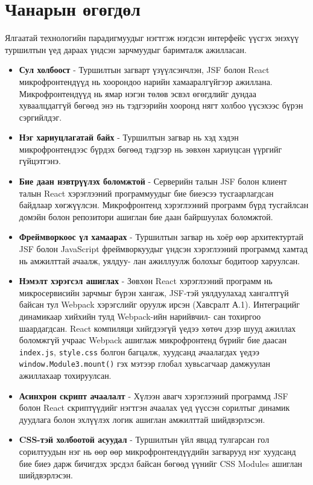 \section{Чанарын өгөгдөл}
Ялгаатай технологийн парадигмуудыг нэгтгэж нэгдсэн интерфейс үүсгэх энэхүү туршилтын үед дараах үндсэн зарчмуудыг баримталж ажилласан. 

\begin{itemize}
    \item \textbf{Сул холбоост} - Туршилтын загварт үзүүлсэнчлэн, JSF болон React микрофронтендүүд нь хоорондоо нарийн хамааралгүйгээр ажиллана. Микрофронтендүүд нь ямар нэгэн төлөв эсвэл өгөгдлийг дундаа хуваалцдаггүй бөгөөд энэ нь тэдгээрийн хооронд нягт холбоо үүсэхээс бүрэн сэргийлдэг.
    \item \textbf{Нэг хариуцлагатай байх} - Туршилтын загвар нь хэд хэдэн микрофронтендээс бүрдэх бөгөөд тэдгээр нь зөвхөн хариуцсан үүргийг гүйцэтгэнэ.
    \item \textbf{Бие даан нэвтрүүлэх боломжтой} - Серверийн талын JSF болон клиент талын React хэрэглээний программуудыг бие биеэсээ тусгаарлагдсан байдлаар хөгжүүлсэн. Микрофронтенд хэрэглээний программ бүрд тусгайлсан домэйн болон репозитори ашиглан бие даан байршуулах боломжтой. 
    \item \textbf{Фреймворкоос үл хамаарах} - Туршилтын загвар нь хоёр өөр архитектуртай JSF болон JavaScript фреймворкуудыг үндсэн хэрэглээний программд хамтад нь амжилттай ачаалж, уялдуу- лан ажиллуулж болохыг бодитоор харуулсан.
    \item \textbf{Нэмэлт хэрэгсэл ашиглах} - Зөвхөн React хэрэглээний программ нь микросервисийн зарчмыг бүрэн хангаж, JSF-тэй уялдуулахад хангалтгүй байсан тул Webpack хэрэгслийг оруулж ирсэн (Хавсралт А.1). Интеграцийг динамикаар хийхийн тулд Webpack-ийн нарийвчил- сан тохиргоо шаардагдсан.  React компиляци хийгдээгүй үедээ хөтөч дээр шууд ажиллах боломжгүй учраас Webpack ашиглаж микрофронтенд бүрийг бие даасан \texttt{index.js}, \texttt{style.css} болгон багцалж, хуудсанд ачаалагдах үедээ \texttt{window.Module3.mount()} гэх мэтээр глобал хувьсагчаар дамжуулан ажиллахаар тохируулсан.
    \item \textbf{Асинхрон скрипт ачаалалт} - Хүлээн авагч хэрэглээний программд JSF болон React скриптүүдийг нэгтгэн ачаалах үед үүссэн сорилтыг динамик дуудлага болон эхлүүлэх логик ашиглан амжилттай шийдвэрлэсэн.
    \item \textbf{CSS-тэй холбоотой асуудал} - Туршилтын үйл явцад тулгарсан гол сорилтуудын нэг нь өөр өөр микрофронтендүүдийн загварууд нэг хуудсанд бие биеэ дарж бичигдэх эрсдэл байсан бөгөөд үүнийг CSS Modules ашиглан шийдвэрлэсэн.
\end{itemize}

